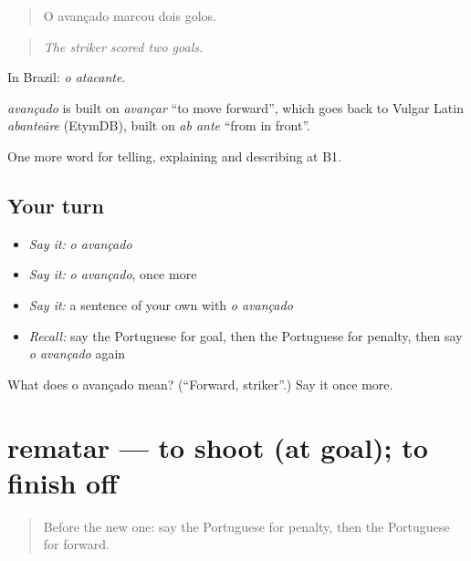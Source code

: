 \begin{quote}
O avançado marcou dois golos.
\end{quote}

\begin{quote}
\emph{The striker scored two goals.}
\end{quote}

In Brazil: \emph{o atacante}.

\begin{cousinweb}
\emph{avançado} is built on \emph{avançar} \textquotedblleft{}to move forward\textquotedblright{}, which goes back to Vulgar Latin \emph{abanteāre} (EtymDB), built on \emph{ab ante} \textquotedblleft{}from in front\textquotedblright{}.
\end{cousinweb}

\begin{grammarlens}[title={What you've built}]
One more word for telling, explaining and describing at B1.
\end{grammarlens}

\subsection*{Your turn}
\begin{itemize}
\raggedright
  \item \emph{Say it:} \emph{o avançado}
  \item \emph{Say it:} \emph{o avançado}, once more
  \item \emph{Say it:} a sentence of your own with \emph{o avançado}
  \item \emph{Recall:} say the Portuguese for goal, then the Portuguese for penalty, then say \emph{o avançado} again
\end{itemize}

\begin{tcolorbox}[breakable,colback=teal!4,colframe=teal!35!black,title={Before you move on}]
What does o avançado mean? (\textquotedblleft{}Forward, striker\textquotedblright{}.) Say it once more.
\end{tcolorbox}
\section[rematar]{rematar — to shoot (at goal); to finish off}

\label{lesson:PT-C509-rematar}



\begin{quote}
Before the new one: say the Portuguese for penalty, then the Portuguese for forward.
\end{quote}

